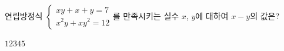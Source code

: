 연립방정식 $\begin{cases} xy+x+y=7 \\ x^2y+xy^2=12 \end{cases}$를 만족시키는 실수 $x$, $y$에 대하여 $x-y$의 값은? 
\begin{choices32}{$1$}{$2$}{$3$}{$4$}{$5$}\end{choices32}
